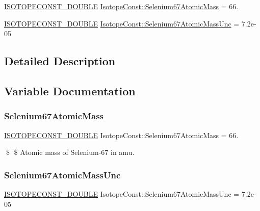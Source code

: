 \begin{DoxyCompactItemize}
\item 
\mbox{\hyperlink{group___isotope_const-_macros_ga8f45a7272ce02c0b4c65c44636ed719a}{I\+S\+O\+T\+O\+P\+E\+C\+O\+N\+S\+T\+\_\+\+D\+O\+U\+B\+LE}} \mbox{\hyperlink{group___isotope_const-_selenium-_se67_ga120ba3b133730f2353320d6f999d7d19}{Isotope\+Const\+::\+Selenium67\+Atomic\+Mass}} = 66.
\item 
\mbox{\hyperlink{group___isotope_const-_macros_ga8f45a7272ce02c0b4c65c44636ed719a}{I\+S\+O\+T\+O\+P\+E\+C\+O\+N\+S\+T\+\_\+\+D\+O\+U\+B\+LE}} \mbox{\hyperlink{group___isotope_const-_selenium-_se67_gaec778c95a6b3e2670d7b3adb58f3d9d6}{Isotope\+Const\+::\+Selenium67\+Atomic\+Mass\+Unc}} = 7.\+2e-\/05
\end{DoxyCompactItemize}


\subsection{Detailed Description}


\subsection{Variable Documentation}
\mbox{\label{group___isotope_const-_selenium-_se67_ga120ba3b133730f2353320d6f999d7d19}} 
\subsubsection{\texorpdfstring{Selenium67\+Atomic\+Mass}{Selenium67AtomicMass}}
{\footnotesize\ttfamily \mbox{\hyperlink{group___isotope_const-_macros_ga8f45a7272ce02c0b4c65c44636ed719a}{I\+S\+O\+T\+O\+P\+E\+C\+O\+N\+S\+T\+\_\+\+D\+O\+U\+B\+LE}} Isotope\+Const\+::\+Selenium67\+Atomic\+Mass = 66.}

\$ \$ Atomic mass of Selenium-\/67 in amu. \mbox{\label{group___isotope_const-_selenium-_se67_gaec778c95a6b3e2670d7b3adb58f3d9d6}} 
\subsubsection{\texorpdfstring{Selenium67\+Atomic\+Mass\+Unc}{Selenium67AtomicMassUnc}}
{\footnotesize\ttfamily \mbox{\hyperlink{group___isotope_const-_macros_ga8f45a7272ce02c0b4c65c44636ed719a}{I\+S\+O\+T\+O\+P\+E\+C\+O\+N\+S\+T\+\_\+\+D\+O\+U\+B\+LE}} Isotope\+Const\+::\+Selenium67\+Atomic\+Mass\+Unc = 7.\+2e-\/05}

